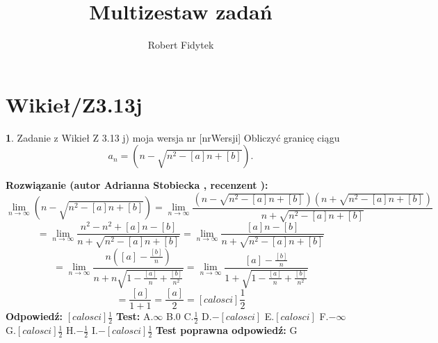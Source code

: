 \documentclass[12pt, a4paper]{article}
\title{Multizestaw zadań}
\author{Robert Fidytek}
\date{}
\theoremstyle{definition} %
\newtheorem{zad}{}
\newcommand{\kategoria}[1]{\section{#1}} %
\newcommand{\zadStart}[1]{\begin{zad}#1\newline} %
\newcommand{\zadStop}{\end{zad}}   %
\newcommand{\rozwStart}[2]{\noindent \textbf{Rozwiązanie (autor #1 , recenzent #2): }\newline} %
\newcommand{\rozwStop}{\newline}                                            %
\newcommand{\odpStart}{\noindent \textbf{Odpowiedź:}\newline}    %
\newcommand{\odpStop}{\newline}                                             %
\newcommand{\testStart}{\noindent \textbf{Test:}\newline} %
\newcommand{\testStop}{\newline} %
\newcommand{\kluczStart}{\noindent \textbf{Test poprawna odpowiedź:}\newline} %
\newcommand{\kluczStop}{\newline} %
\begin{document}
\maketitle


\kategoria{Wikieł/Z3.13j}
\zadStart{Zadanie z Wikieł Z 3.13 j) moja wersja nr [nrWersji]}
Obliczyć granicę ciągu 
$$a_n=(n-\sqrt{n^2-[a]n+[b]}).$$
\zadStop
\rozwStart{Adrianna Stobiecka}{}
$$\lim_{n\to\infty}(n-\sqrt{n^2-[a]n+[b]})=\lim_{n\to\infty}\frac{(n-\sqrt{n^2-[a]n+[b]})(n+\sqrt{n^2-[a]n+[b]})}{n+\sqrt{n^2-[a]n+[b]}}$$
$$=\lim_{n\to\infty}\frac{n^2-n^2+[a]n-[b]}{n+\sqrt{n^2-[a]n+[b]}}=\lim_{n\to\infty}\frac{[a]n-[b]}{n+\sqrt{n^2-[a]n+[b]}}$$
$$=\lim_{n\to\infty}\frac{n([a]-\frac{[b]}{n})}{n+n\sqrt{1-\frac{[a]}{n}+\frac{[b]}{n^2}}}=\lim_{n\to\infty}\frac{[a]-\frac{[b]}{n}}{1+\sqrt{1-\frac{[a]}{n}+\frac{[b]}{n^2}}}$$
$$=\frac{[a]}{1+1}=\frac{[a]}{2}=[calosci]\frac{1}{2}$$
\rozwStop
\odpStart
$[calosci]\frac{1}{2}$
\odpStop
\testStart
A.$\infty$
B.$0$
C.$\frac{1}{2}$
D.$-[calosci]$
E.$[calosci]$
F.$-\infty$
G.$[calosci]\frac{1}{2}$
H.$-\frac{1}{2}$
I.$-[calosci]\frac{1}{2}$
\testStop
\kluczStart
G
\kluczStop
\end{document}
